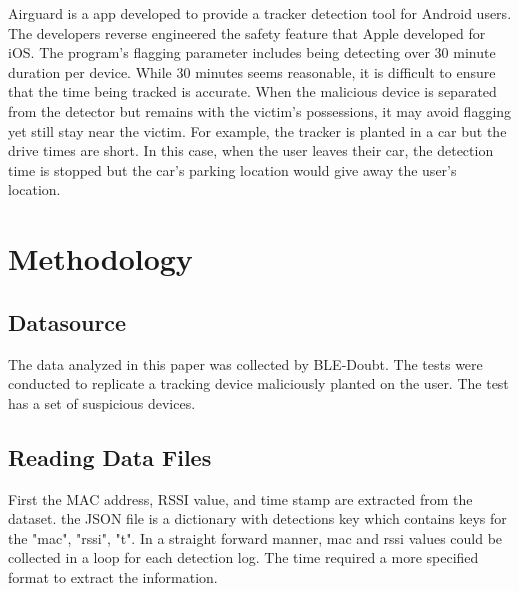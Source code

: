 \documentclass{article}
\begin{document}
\begin{multicols}{2}
Airguard is a app developed to provide a tracker detection tool for Android users. The developers reverse engineered the safety feature that Apple developed for iOS. \cite{heinrich2022airguard} The program's flagging parameter includes being detecting over 30 minute duration per device. While 30 minutes seems reasonable, it is difficult to ensure that the time being tracked is accurate. When the malicious device is separated from the detector but remains with the victim's possessions, it may avoid flagging yet still stay near the victim. For example, the tracker is planted in a car but the drive times are short. In this case, when the user leaves their car, the detection time is stopped but the car's parking location would give away the user's location.



\end{multicols}
\section{Methodology}
\subsection{Datasource}
The data analyzed in this paper was collected by BLE-Doubt.\cite{briggs2022ble} The tests were conducted to replicate a tracking device maliciously planted on the user. The test has a set of suspicious devices.

\subsection{Reading Data Files}
First the MAC address, RSSI value, and time stamp are extracted from the dataset. the JSON file is a dictionary with detections key which contains keys for the "mac", "rssi", "t". In a straight forward manner, mac and rssi values could be collected in a loop for each detection log. The time required a more specified format to extract the information. 
\inputminted[firstline=31, 
lastline=34,
frame=lines,
framesep=2mm,
baselinestretch=1.2,
bgcolor=LightGray,
fontsize=\scriptsize,
]{python}{Final.py}
\end{document}
